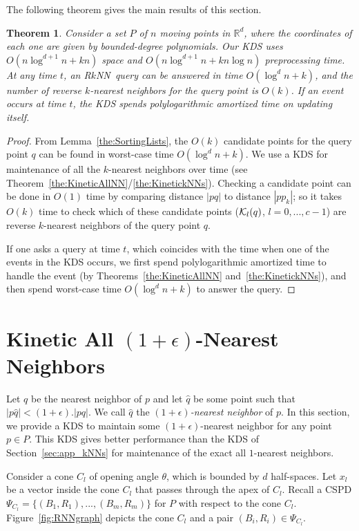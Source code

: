 \documentclass[preprint,12pt]{elsarticle}
\def\rknn{\mbox{R$k$NN}}
\newtheorem{theorem}{Theorem}[section]
\begin{document}
The following theorem gives the main results of this section.

\begin{theorem}\label{the:KineticRkNNQ}
Consider a set $P$ of $n$ moving points in $\mathbb{R}^d$, where the coordinates of each one are given by bounded-degree polynomials. Our KDS uses $O(n\log^{d+1} n + kn)$ space and $O(n\log^{d+1} n + kn\log n)$ preprocessing time. At any time $t$, an \rknn~query can be answered in time $O(\log^d n+k)$, and the number of reverse $k$-nearest neighbors for the query point is $O(k)$. If an event occurs at time $t$, the KDS spends polylogarithmic amortized time on updating itself.
\end{theorem}
\begin{proof}
From Lemma~\ref{the:SortingLists}, the $O(k)$ candidate points for the query point $q$ can be found in worst-case time $O(\log^d n +k)$. We use a KDS for maintenance of all the $k$-nearest neighbors over time (see  Theorem~\ref{the:KineticAllNN}/\ref{the:KinetickNNs}). Checking a candidate point can be done in $O(1)$ time by comparing distance $|pq|$ to distance $|pp_k|$; so it takes $O(k)$ time to check which of these candidate points (${\cal K}_l(q)$, $l=0,...,c-1$) are reverse $k$-nearest neighbors of the query point $q$.

If one asks a query at time $t$, which coincides with the time when one of the events in the KDS occurs, we first spend polylogarithmic amortized time to handle the event (by  Theorems~\ref{the:KineticAllNN} and~\ref{the:KinetickNNs}), and then spend worst-case time $O(\log^d n +k)$ to answer the query.
\end{proof}

\section{Kinetic All $(1+\epsilon)$-Nearest Neighbors}\label{sec:KineticEpsANN}
Let $q$ be the nearest neighbor of $p$ and let $\hat{q}$ be some point such that $|p\hat{q}|<(1+\epsilon).|pq|$. We call $\hat{q}$ the \textit{$(1+\epsilon)$-nearest neighbor} of $p$. In this section, we provide a KDS to maintain some $(1+\epsilon)$-nearest neighbor for any point $p\in P$. This KDS gives better performance than the KDS of Section~\ref{sec:app_kNNs} for maintenance of the exact all $1$-nearest neighbors.


Consider a cone $C_l$ of opening angle $\theta$, which is bounded by $d$ half-spaces. Let $x_l$ be a vector inside the cone $C_l$ that passes through the apex of $C_l$. Recall a CSPD $\Psi_{C_l}=\{(B_1,R_1),...,(B_m,R_m)\}$ for $P$ with respect to the cone $C_l$. Figure~\ref{fig:RNNgraph} depicts the cone $C_l$ and a pair $(B_i,R_i)\in \Psi_{C_l}$. 
\end{document}

